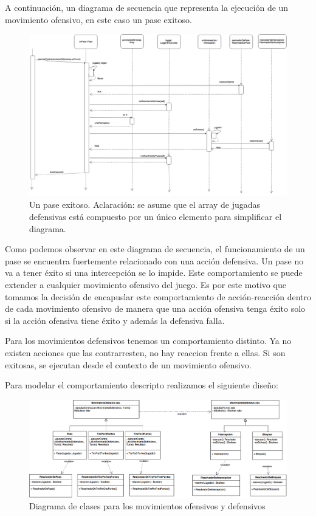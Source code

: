 A continuación, un diagrama de secuencia que representa la ejecución de un movimiento ofensivo, en este caso un pase exitoso.

\begin{landscape}

  \begin{figure}[h!]
   \includegraphics[scale=0.35]{imagenes/pase-exitoso.png}
   \caption{Un pase exitoso. Aclaración: se asume que el array de jugadas defensivas está compuesto por un único elemento para simplificar el diagrama.}
  \end{figure}

\end{landscape}

Como podemos observar en este diagrama de secuencia, el funcionamiento de un pase se encuentra fuertemente relacionado con una acción defensiva.
Un pase no va a tener éxito si una intercepción se lo impide. Este comportamiento se puede extender a cualquier movimiento ofensivo del juego.
Es por este motivo que tomamos la decisión de encapuslar este comportamiento de acción-reacción dentro de cada movimiento ofensivo
de manera que una acción ofensiva tenga éxito solo si la acción ofensiva tiene éxito y además la defensiva falla. 

Para los movimientos defensivos tenemos un comportamiento distinto. Ya no existen acciones que las contrarresten, no hay reaccion frente a ellas.
Si son exitosas, se ejecutan desde el contexto de un movimiento ofensivo. 

Para modelar el comportamiento descripto realizamos el siguiente diseño:

\begin{figure}[h!]
  \includegraphics[scale=0.25]{imagenes/movimientos.png}
  \caption{Diagrama de clases para los movimientos ofensivos y defensivos}
\end{figure}

